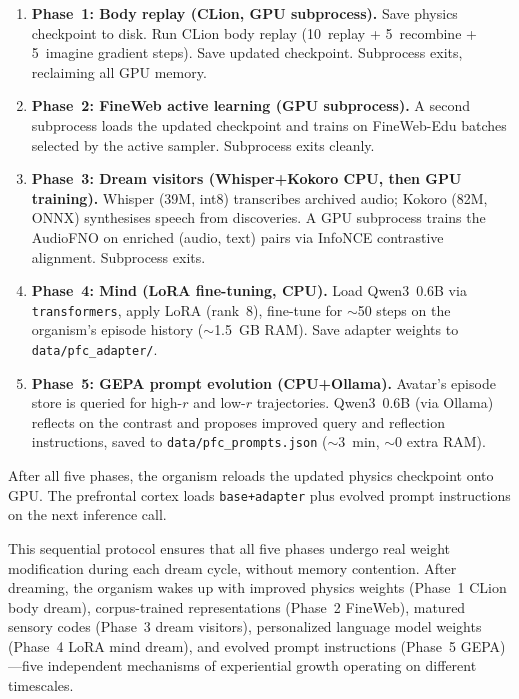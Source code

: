 \documentclass[11pt,a4paper,twocolumn]{article}
\begin{document}
\begin{enumerate}
\item \textbf{Phase~1: Body replay (CLion, GPU subprocess).} Save physics checkpoint to disk. Run CLion body replay (10~replay + 5~recombine + 5~imagine gradient steps). Save updated checkpoint. Subprocess exits, reclaiming all GPU memory.
\item \textbf{Phase~2: FineWeb active learning (GPU subprocess).} A second subprocess loads the updated checkpoint and trains on FineWeb-Edu batches selected by the active sampler. Subprocess exits cleanly.
\item \textbf{Phase~3: Dream visitors (Whisper+Kokoro CPU, then GPU training).} Whisper (39M, int8) transcribes archived audio; Kokoro (82M, ONNX) synthesises speech from discoveries. A GPU subprocess trains the AudioFNO on enriched (audio, text) pairs via InfoNCE contrastive alignment. Subprocess exits.
\item \textbf{Phase~4: Mind (LoRA fine-tuning, CPU).} Load Qwen3~0.6B via \texttt{transformers}, apply LoRA (rank~8), fine-tune for $\sim$50 steps on the organism's episode history ($\sim$1.5~GB RAM). Save adapter weights to \texttt{data/pfc\_adapter/}.
\item \textbf{Phase~5: GEPA prompt evolution (CPU+Ollama).} Avatar's episode store is queried for high-$r$ and low-$r$ trajectories. Qwen3~0.6B (via Ollama) reflects on the contrast and proposes improved query and reflection instructions, saved to \texttt{data/pfc\_prompts.json} ($\sim$3~min, $\sim$0 extra RAM).
\end{enumerate}

After all five phases, the organism reloads the updated physics checkpoint onto GPU. The prefrontal cortex loads \texttt{base+adapter} plus evolved prompt instructions on the next inference call.

This sequential protocol ensures that all five phases undergo real weight modification during each dream cycle, without memory contention. After dreaming, the organism wakes up with improved physics weights (Phase~1 CLion body dream), corpus-trained representations (Phase~2 FineWeb), matured sensory codes (Phase~3 dream visitors), personalized language model weights (Phase~4 LoRA mind dream), and evolved prompt instructions (Phase~5 GEPA)---five independent mechanisms of experiential growth operating on different timescales.

\end{document}
